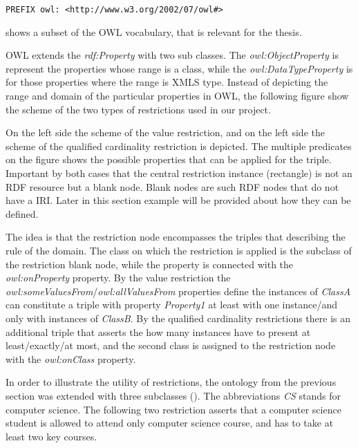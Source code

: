 \begin{lstlisting}[basicstyle=\footnotesize, captionpos=b, caption=OWL namespace, label=lst:sparql, belowskip=1em, aboveskip=2em,
frame=single]
PREFIX owl: <http://www.w3.org/2002/07/owl#>
\end{lstlisting}


 shows a subset of the OWL vocabulary, that is relevant for the thesis.



OWL extends the \textit{rdf:Property} with two sub classes. The \textit{owl:ObjectProperty} is represent the properties whose range is a class, while the \textit{owl:DataTypeProperty} is for those properties where the range is XMLS type. Instead of depicting the range and domain of the particular properties in OWL, the following figure show the scheme of the two types of restrictions used in our project.


On the left side the scheme of the value restriction, and on the left side the scheme of the qualified cardinality restriction is depicted. The multiple predicates on the figure shows the possible properties that can be applied for the triple. Important by both cases that the central restriction instance (rectangle) is not an RDF resource but a blank node. Blank nodes are such RDF nodes that do not have a IRI. Later in this section example will be provided about how they can be defined. 

The idea is that the restriction node encompasses the triples that describing the rule of the domain. The class on which the restriction is applied is the subclass of the restriction blank node, while the property is connected with the \textit{owl:onProperty} property. By the value restriction the \textit{owl:someValuesFrom}/\textit{owl:allValuesFrom} properties define the instances of \textit{ClassA} can constitute a triple with property \textit{Property1} at least with one instance/and only with instances of \textit{ClassB}. By the qualified cardinality restrictions there is an additional triple that asserts the how many instances have to present at least/exactly/at most, and the second class is assigned to the restriction node with the \textit{owl:onClass} property.



In order to illustrate the utility of restrictions, the ontology from the previous section was extended with three subclasses (). The abbreviations \textit{CS} stands for computer science. The following two restriction asserts that a computer science student is allowed to attend only computer science course, and has to take at least two key courses.

